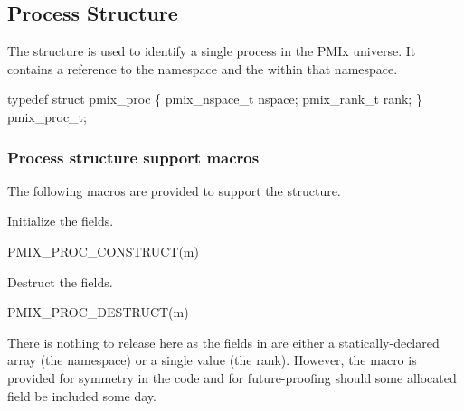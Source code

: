 \subsection{Process Structure}

The  structure is used to identify a single process in the PMIx universe.
It contains a reference to the namespace and the  within that namespace.

\cspecificstart
\begin{codepar}
typedef struct pmix_proc \{
    pmix_nspace_t nspace;
    pmix_rank_t rank;
\} pmix_proc_t;
\end{codepar}
\cspecificend

\subsubsection{Process structure support macros}
The following macros are provided to support the  structure.


Initialize the  fields.

\cspecificstart
\begin{codepar}
PMIX_PROC_CONSTRUCT(m)
\end{codepar}
\cspecificend

\begin{arglist}
\end{arglist}


Destruct the  fields.

\cspecificstart
\begin{codepar}
PMIX_PROC_DESTRUCT(m)
\end{codepar}
\cspecificend

\begin{arglist}
\end{arglist}

There is nothing to release here as the fields in  are either a statically-declared array (the namespace) or a single value (the rank). However, the macro is provided for symmetry in the code and for future-proofing should some allocated field be included some day.


